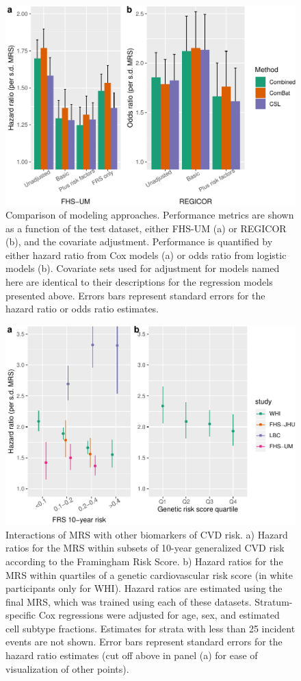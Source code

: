 \documentclass[]{article}
\begin{document}
\begin{figure}[h]
\includegraphics{figures/csl-comparison-1} \caption{Comparison of modeling approaches. Performance metrics are shown as a function of the test dataset, either FHS-UM (a) or REGICOR (b), and the covariate adjustment. Performance is quantified by either hazard ratio from Cox models (a) or odds ratio from logistic models (b). Covariate sets used for adjustment for models named here are identical to their descriptions for the regression models presented above. Errors bars represent standard errors for the hazard ratio or odds ratio estimates.}\label{fig:csl-comparison}
\end{figure}

\newpage

\begin{figure}[h]
\includegraphics{figures/interactions-1} \caption{Interactions of MRS with other biomarkers of CVD risk. a) Hazard ratios for the MRS within subsets of 10-year generalized CVD risk according to the Framingham Risk Score. b) Hazard ratios for the MRS within quartiles of a genetic cardiovascular risk score (in white participants only for WHI). Hazard ratios are estimated using the final MRS, which was trained using each of these datasets. Stratum-specific Cox regressions were adjusted for age, sex, and estimated cell subtype fractions. Estimates for strata with less than 25 incident events are not shown. Error bars represent standard errors for the hazard ratio estimates (cut off above in panel (a) for ease of visualization of other points).}\label{fig:interactions}
\end{figure}
\end{document}
